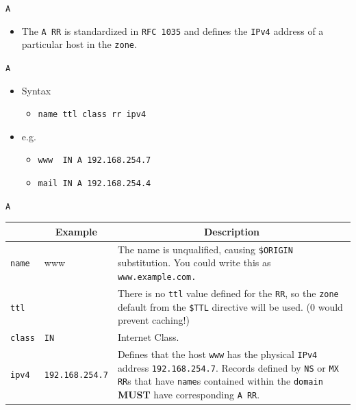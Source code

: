 \documentclass[aspectratio=169,xcolor=table]{beamer}
\begin{document}
\begin{frame}{\texttt{A}}
  \begin{itemize}
      \item The \texttt{A RR} is standardized in \texttt{RFC 1035} and defines the \texttt{IPv4} address of a particular host in the \texttt{zone}.
  \end{itemize}
\end{frame}

\begin{frame}{\texttt{A}}
  \begin{itemize}
    \item Syntax
      \begin{itemize}
        \item \texttt{name ttl class rr ipv4}
      \end{itemize}
    \item e.g.
      \begin{itemize}
        \item \texttt{www ~IN A 192.168.254.7}
        \item \texttt{mail IN A 192.168.254.4}
      \end{itemize}
  \end{itemize}
\end{frame}

\begin{frame}{\texttt{A}}
  \begin{table}
    \tiny
    \begin{tabular}{|p{1.6cm}|p{1.6cm}|p{5.7cm}|} 
      \hline
      \rowcolor{gray}
      \multicolumn{1}{|c|}{Syntax} & \multicolumn{1}{c|}{Example} & \multicolumn{1}{c|}{Description}\\ 
      \hline
      \texttt{name}&www&The name is unqualified, causing \texttt{\$ORIGIN} substitution. You could write this as \texttt{www.example.com.}\\
      \hline
      \texttt{ttl}&&There is no \texttt{ttl} value defined for the \texttt{RR}, so the \texttt{zone} default from the \texttt{\$TTL} directive will be used. (0 would prevent caching!)\\
      \hline
      \texttt{class}&\texttt{IN}&Internet Class.\\
      \hline
      \texttt{ipv4}&\texttt{192.168.254.7}&Defines that the host \texttt{www} has the physical \texttt{IPv4} address \texttt{192.168.254.7}. Records defined by \texttt{NS} or \texttt{MX RR}s that have \texttt{name}s contained within the \texttt{domain} \textbf{MUST} have corresponding \texttt{A RR}.\\
      \hline
    \end{tabular}
  \end{table}
\end{frame}
\end{document}

